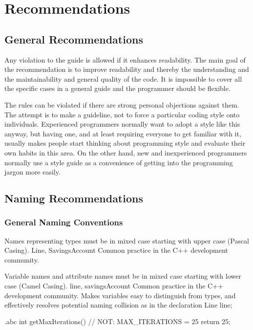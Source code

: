 \chapter{Recommendations}
\section{General Recommendations}
\vspace{.5cm}
\recommendation
{Any violation to the guide is allowed if it enhances readability.}
{}
{The main goal of the recommendation is to improve readability and thereby the understanding and the maintainability and general quality of the code. It is impossible to cover all the specific cases in a general guide and the programmer should be flexible.}

\recommendation
{The rules can be violated if there are strong personal objections against them.}
{}
{The attempt is to make a guideline, not to force a particular coding style onto individuals. Experienced programmers normally want to adopt a style like this anyway, but having one, and at least requiring everyone to get familiar with it, usually makes people start thinking about programming style and evaluate their own habits in this area.\newline
On the other hand, new and inexperienced programmers normally use a style guide as a convenience of getting into the programming jargon more easily.}

\section{Naming Recommendations}
\subsection{General Naming Conventions}
\recommendation
{Names representing types must be in mixed case starting with upper case (Pascal Casing).}
{Line, SavingsAccount}
{Common practice in the C++ development community.}

\recommendation
{Variable names and attribute names must be in mixed case starting with lower case (Camel Casing).}
{line, savingsAccount}
{Common practice in the C++ development community. Makes variables easy to distinguish from types, and effectively resolves potential naming collision as in the declaration Line line;}

\begin{filecontents*}{\jobname.abc}
	int getMaxIterations() // NOT: MAX_ITERATIONS = 25
	{
	    return 25;
	}
\end{filecontents*}

